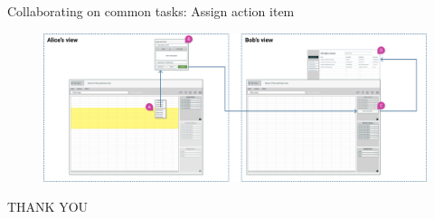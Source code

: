 \documentclass[aspectratio=169]{beamer}
\makeatletter
\newenvironment{restoretext}%
    {\@parboxrestore%
     \begin{adjustwidth}{-8mm}{-8mm}%
                \begin{lrbox}{\restorebox}%
                \begin{minipage}{\linewidth}%
    }{\end{minipage}\end{lrbox}
        \usebox\restorebox
        \end{adjustwidth}
     }
\makeatother
\begin{document}
\begin{frame}{Collaborating on common tasks: Assign action item}
    \vspace{2em}
    \begin{restoretext}
    \begin{figure}[h]
        \centering
        \includegraphics[width=1\textwidth]{images/assign-action-item.png}
    \end{figure}
\end{restoretext}
\end{frame}


\begin{frame}[DarkSlide]{}
    \vspace{3em}
    \centering
    \Large THANK YOU\\
\end{frame}
\end{document}
